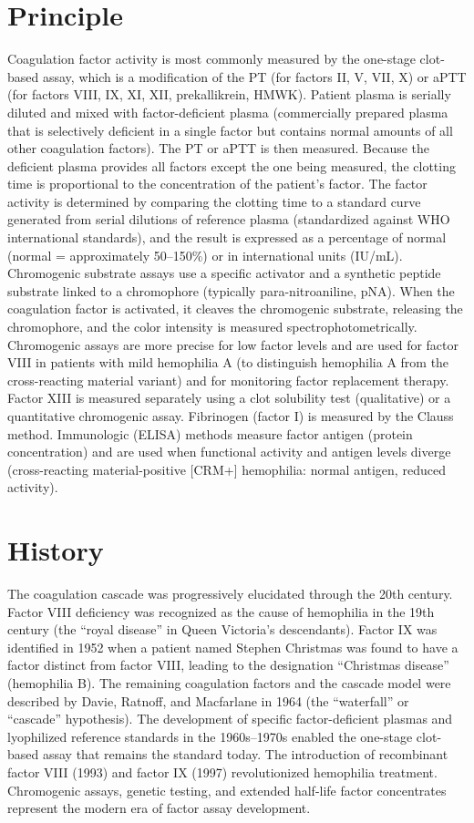 \section*{Principle}
Coagulation factor activity is most commonly measured by the one-stage clot-based assay, which is a modification of the PT (for factors II, V, VII, X) or aPTT (for factors VIII, IX, XI, XII, prekallikrein, HMWK). Patient plasma is serially diluted and mixed with factor-deficient plasma (commercially prepared plasma that is selectively deficient in a single factor but contains normal amounts of all other coagulation factors). The PT or aPTT is then measured. Because the deficient plasma provides all factors except the one being measured, the clotting time is proportional to the concentration of the patient's factor. The factor activity is determined by comparing the clotting time to a standard curve generated from serial dilutions of reference plasma (standardized against WHO international standards), and the result is expressed as a percentage of normal (normal = approximately 50--150\%) or in international units (IU/mL). Chromogenic substrate assays use a specific activator and a synthetic peptide substrate linked to a chromophore (typically para-nitroaniline, pNA). When the coagulation factor is activated, it cleaves the chromogenic substrate, releasing the chromophore, and the color intensity is measured spectrophotometrically. Chromogenic assays are more precise for low factor levels and are used for factor VIII in patients with mild hemophilia A (to distinguish hemophilia A from the cross-reacting material variant) and for monitoring factor replacement therapy. Factor XIII is measured separately using a clot solubility test (qualitative) or a quantitative chromogenic assay. Fibrinogen (factor I) is measured by the Clauss method. Immunologic (ELISA) methods measure factor antigen (protein concentration) and are used when functional activity and antigen levels diverge (cross-reacting material-positive [CRM+] hemophilia: normal antigen, reduced activity).

\section*{History}
The coagulation cascade was progressively elucidated through the 20th century. Factor VIII deficiency was recognized as the cause of hemophilia in the 19th century (the ``royal disease'' in Queen Victoria's descendants). Factor IX was identified in 1952 when a patient named Stephen Christmas was found to have a factor distinct from factor VIII, leading to the designation ``Christmas disease'' (hemophilia B). The remaining coagulation factors and the cascade model were described by Davie, Ratnoff, and Macfarlane in 1964 (the ``waterfall'' or ``cascade'' hypothesis). The development of specific factor-deficient plasmas and lyophilized reference standards in the 1960s--1970s enabled the one-stage clot-based assay that remains the standard today. The introduction of recombinant factor VIII (1993) and factor IX (1997) revolutionized hemophilia treatment. Chromogenic assays, genetic testing, and extended half-life factor concentrates represent the modern era of factor assay development.


